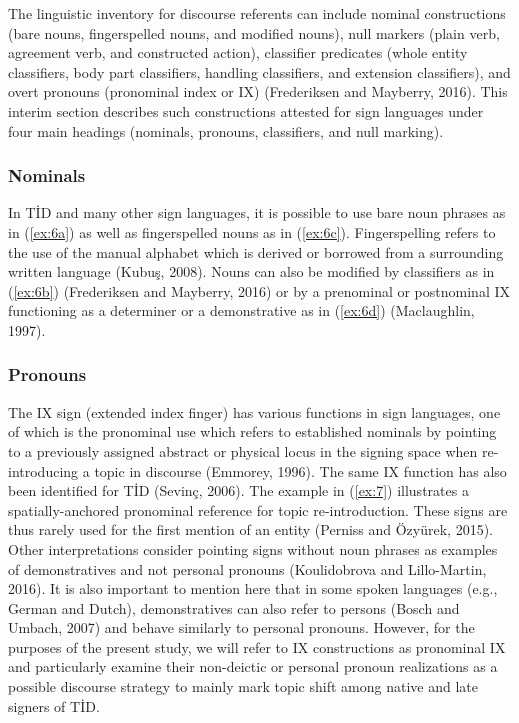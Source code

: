 \documentclass[]{elsarticle} %
\begin{document}
The linguistic inventory for discourse referents can include nominal
constructions (bare nouns, fingerspelled nouns, and modified nouns),
null markers (plain verb, agreement verb, and constructed action),
classifier predicates (whole entity classifiers, body part classifiers,
handling classifiers, and extension classifiers), and overt pronouns
(pronominal index or IX) (Frederiksen and Mayberry, 2016). This interim
section describes such constructions attested for sign languages under
four main headings (nominals, pronouns, classifiers, and null marking).

\hypertarget{nominals}{%
\subsubsection{Nominals}\label{nominals}}

In TİD and many other sign languages, it is possible to use bare noun
phrases as in (\ref{ex:6a}) as well as fingerspelled nouns as in
(\ref{ex:6c}). Fingerspelling refers to the use of the manual alphabet
which is derived or borrowed from a surrounding written language (Kubuş,
2008). Nouns can also be modified by classifiers as in (\ref{ex:6b})
(Frederiksen and Mayberry, 2016) or by a prenominal or postnominal IX
functioning as a determiner or a demonstrative as in (\ref{ex:6d})
(Maclaughlin, 1997).

\hypertarget{pronouns}{%
\subsubsection{Pronouns}\label{pronouns}}

The IX sign (extended index finger) has various functions in sign
languages, one of which is the pronominal use which refers to
established nominals by pointing to a previously assigned abstract or
physical locus in the signing space when re-introducing a topic in
discourse (Emmorey, 1996). The same IX function has also been identified
for TİD (Sevinç, 2006). The example in (\ref{ex:7}) illustrates a
spatially-anchored pronominal reference for topic re-introduction. These
signs are thus rarely used for the first mention of an entity (Perniss
and Özyürek, 2015). Other interpretations consider pointing signs
without noun phrases as examples of demonstratives and not personal
pronouns (Koulidobrova and Lillo-Martin, 2016). It is also important to
mention here that in some spoken languages (e.g., German and Dutch),
demonstratives can also refer to persons (Bosch and Umbach, 2007) and
behave similarly to personal pronouns. However, for the purposes of the
present study, we will refer to IX constructions as pronominal IX and
particularly examine their non-deictic or personal pronoun realizations
as a possible discourse strategy to mainly mark topic shift among native
and late signers of TİD.
\end{document}
